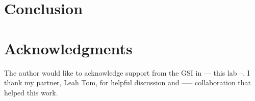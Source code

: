 \documentclass[10pt,letterpaper,oneside] {article}
\begin{document}
 \section{Conclusion}
\section{Acknowledgments}
The author would  like to acknowledge support from the GSI in --- this lab --.  I thank my partner, Leah Tom, for helpful discussion and ----- collaboration that helped this work.


\end{document}
